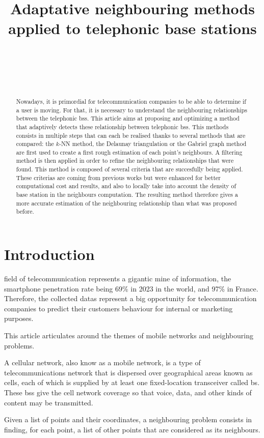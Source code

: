 \documentclass[lettersize,journal,english]{IEEEtran}
\title{Adaptative neighbouring methods applied to telephonic base stations}
\author{\IEEEauthorblockN{Paul MÉHAUD}\\
\IEEEauthorblockA{\textit{Intern at CTU in Prague} \\
\textit{INSA Rouen Normandie}\\
paul.mehaud@insa-rouen.fr}\\
\and
\IEEEauthorblockN{Brendan SÉVELLEC}\\
\IEEEauthorblockA{\textit{Intern at CTU in Prague} \\
\textit{INSA Rouen Normandie}\\
brendan.sevellec@insa-rouen.fr}}
\begin{document}
\maketitle

\begin{abstract}
    Nowadays, it is primordial for telecommunication companies to be able to determine if a user is moving. For that, it is necessary to understand the neighbouring relationships between the telephonic \acrlong{bs}s. This article aims at proposing and optimizing a method that adaptively detects these relationship between telephonic \acrlong{bs}s. This methods consists in multiple steps that can each be realised thanks to several methods that are compared: the $k$-NN method, the Delaunay triangulation or the Gabriel graph method are first used to create a first rough estimation of each point's neighbours. A filtering method is then applied in order to refine the neighbouring relationships that were found. This method is composed of several criteria that are succesfully being applied. These criterias are coming from previous works but were enhanced for better computational cost and results, and also to locally take into account the density of base station in the neighbours computation. The resulting method therefore gives a more accurate estimation of the neighbouring relationship than what was proposed before.
\end{abstract}
\section{Introduction}
     field of telecommunication represents a gigantic mine of information, the smartphone penetration rate being 69\% in 2023 in the world, and 97\% in France. Therefore, the collected datas represent a big opportunity for telecommunication companies to predict their customers behaviour for internal or marketing purposes. 
    
    This article articulates around the themes of mobile networks and neighbouring problems. 

    A cellular network, also know as a mobile network, is a type of telecommunications network that is dispersed over geographical areas known as cells, each of which is supplied by at least one fixed-location transceiver called \acrfull{bs}. These \acrshort{bs}s give the cell network coverage so that voice, data, and other kinds of content may be transmitted.
    
    Given a list of points and their coordinates, a neighbouring problem consists in finding, for each point, a list of other points that are considered as its neighbours.
\end{document}
